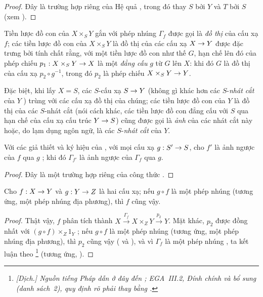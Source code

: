\documentclass[oneside]{amsart}
\makeatletter
\newcommand{\ega@arrow}[2]{\mathchoice{#1}{#2}{#2}{#2}}
\renewcommand{\to}{\ega@arrow{\longrightarrow}{\rightarrow}}
\newcommand{\oldpage}[2][]{{\marginnote{\normalfont\textbf{#1}~|~#2}}\ignorespaces}
\let\EGAOriginalLabel\label
\renewcommand{\label}[1]{\phantomsection\EGAOriginalLabel{#1}}
\makeatother
\begin{document}
\begin{proof}
Đây là trường hợp riêng của Hệ quả , trong đó thay $S$ bởi $Y$ và $T$ bởi $S$ (xem ).
\end{proof}

\oldpage[I]{134}
Tiền lược đồ con của $X\times_S Y$ gắn với phép nhúng $\Gamma_f$  được gọi là \emph{đồ thị} của cấu xạ $f$;
các tiền lược đồ con của $X\times_S Y$ là đồ thị của các cấu xạ $X\to Y$ được đặc trưng bởi tính chất rằng, với một tiền lược đồ con như thế $G$, hạn chế lên đó của phép chiếu $p_1:X\times_S Y\to X$ là một \emph{đẳng cấu} $g$ từ $G$ lên $X$:
khi đó $G$ là đồ thị của cấu xạ $p_2\circ g^{-1}$, trong đó $p_2$ là phép chiếu $X\times_S Y\to Y$.

Đặc biệt, khi lấy $X=S$, các $S$-cấu xạ $S\to Y$ (không gì khác hơn các $S$-\emph{nhát cắt} của $Y$ ) trùng với các cấu xạ đồ thị của chúng;
các tiền lược đồ con của $Y$ là đồ thị của các $S$-nhát cắt (nói cách khác, các tiền lược đồ con đẳng cấu với $S$ qua hạn chế của cấu xạ cấu trúc $Y\to S$) cũng được gọi là \emph{ảnh} của các nhát cắt này hoặc, do lạm dụng ngôn ngữ, là các $S$-\emph{nhát cắt} của $Y$.

\begin{corollary}[5.3.12]
\label{I.5.3.12}
Với các giả thiết và ký hiệu của , với mọi cấu xạ $g:S'\to S$, cho $f'$ là ảnh ngược của $f$ qua $g$ ;
khi đó $\Gamma_{f'}$ là ảnh ngược của $\Gamma_f$ qua $g$.
\end{corollary}

\begin{proof}
Đây là một trường hợp riêng của công thức .
\end{proof}

\begin{corollary}[5.3.13]
\label{I.5.3.13}
Cho $f:X\to Y$ và $g:Y\to Z$ là hai cấu xạ;
nếu $g\circ f$ là một phép nhúng (tương ứng, một phép nhúng địa phương), thì $f$ cũng vậy.
\end{corollary}

\begin{proof}
Thật vậy, $f$ phân tích thành $X\xrightarrow{\Gamma_f}X\times_Z Y\xrightarrow{p_2}Y$.
Mặt khác, $p_2$ được đồng nhất với $(g\circ f)\times_Z 1_Y$ ;
nếu $g\circ f$ là một phép nhúng (tương ứng, một phép nhúng địa phương), thì $p_2$ cũng vậy ( và ), và vì $\Gamma_f$ là một phép nhúng , ta kết luận theo \footnote{\emph{[Dịch.] Nguồn tiếng Pháp dẫn ở đây đến ; EGA~III.2, Đính chính và bổ sung (danh sách~2), quy định rõ phải thay bằng .}} (tương ứng, ).
\end{proof}
\end{document}
